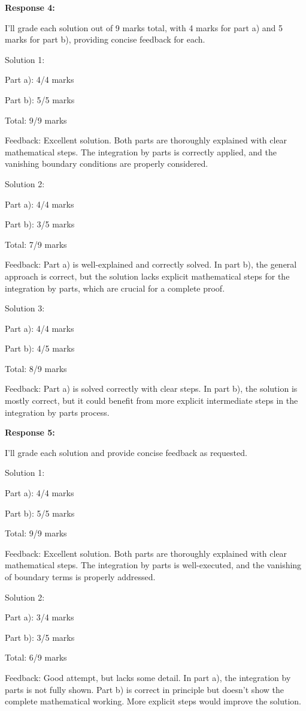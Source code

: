\documentclass[a4paper,11pt]{article}
\begin{document}
\bigskip   
\textbf{Response 4:}

I'll grade each solution out of 9 marks total, with 4 marks for part a) and 5 marks for part b), providing concise feedback for each.

Solution 1:

Part a): 4/4 marks

Part b): 5/5 marks

Total: 9/9 marks

Feedback: Excellent solution. Both parts are thoroughly explained with clear mathematical steps. The integration by parts is correctly applied, and the vanishing boundary conditions are properly considered.

Solution 2:

Part a): 4/4 marks

Part b): 3/5 marks

Total: 7/9 marks

Feedback: Part a) is well-explained and correctly solved. In part b), the general approach is correct, but the solution lacks explicit mathematical steps for the integration by parts, which are crucial for a complete proof.

Solution 3:

Part a): 4/4 marks

Part b): 4/5 marks

Total: 8/9 marks

Feedback: Part a) is solved correctly with clear steps. In part b), the solution is mostly correct, but it could benefit from more explicit intermediate steps in the integration by parts process.

\bigskip   
\textbf{Response 5:}

I'll grade each solution and provide concise feedback as requested.

Solution 1:

Part a): 4/4 marks

Part b): 5/5 marks

Total: 9/9 marks

Feedback: Excellent solution. Both parts are thoroughly explained with clear mathematical steps. The integration by parts is well-executed, and the vanishing of boundary terms is properly addressed.

Solution 2:

Part a): 3/4 marks

Part b): 3/5 marks

Total: 6/9 marks

Feedback: Good attempt, but lacks some detail. In part a), the integration by parts is not fully shown. Part b) is correct in principle but doesn't show the complete mathematical working. More explicit steps would improve the solution.
\end{document}
